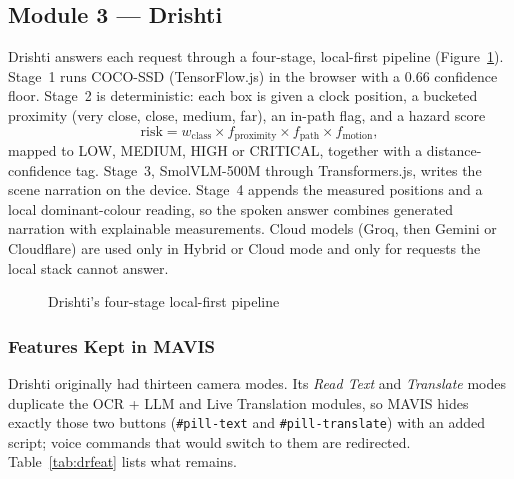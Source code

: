 \documentclass[12pt,singleside,a4paper]{article}
\begin{document}
\subsection{Module 3 --- Drishti}
Drishti answers each request through a four-stage, local-first pipeline (Figure~\ref{fig:drpipe}). Stage~1 runs COCO-SSD \cite{liu2016ssd,sandler2018} (TensorFlow.js) in the browser with a 0.66 confidence floor. Stage~2 is deterministic: each box is given a clock position, a bucketed proximity (very close, close, medium, far), an in-path flag, and a hazard score
\begin{equation}
\text{risk} = w_{\text{class}} \times f_{\text{proximity}} \times f_{\text{path}} \times f_{\text{motion}},
\end{equation}
mapped to LOW, MEDIUM, HIGH or CRITICAL, together with a distance-confidence tag. Stage~3, SmolVLM-500M \cite{marafioti2025} through Transformers.js, writes the scene narration on the device. Stage~4 appends the measured positions and a local dominant-colour reading, so the spoken answer combines generated narration with explainable measurements. Cloud models (Groq, then Gemini or Cloudflare) are used only in Hybrid or Cloud mode and only for requests the local stack cannot answer.

\begin{figure}[H]
\centering
{}
\caption{Drishti's four-stage local-first pipeline}
\label{fig:drpipe}
\end{figure}

\subsubsection{Features Kept in MAVIS}
Drishti originally had thirteen camera modes. Its \emph{Read Text} and \emph{Translate} modes duplicate the OCR + LLM and Live Translation modules, so MAVIS hides exactly those two buttons (\texttt{\#pill-text} and \texttt{\#pill-translate}) with an added script; voice commands that would switch to them are redirected. Table~\ref{tab:drfeat} lists what remains.
\end{document}
